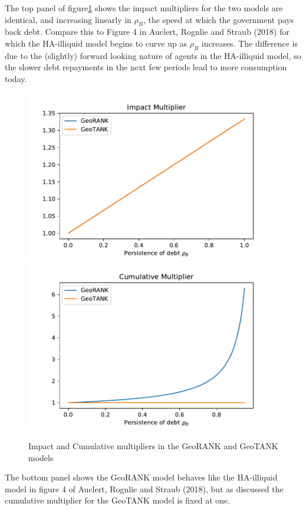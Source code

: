 \documentclass{article}
\begin{document}
The top panel of figure\ref{fig:multipliers} shows the impact multipliers for the two models are identical, and increasing linearly in $\rho_B$, the speed at which the government pays back debt. Compare this to Figure 4 in Auclert, Rognlie and Straub (2018) for which the HA-illiquid model begins to curve up as $\rho_B$ increases. The difference is due to the (slightly) forward looking nature of agents in the HA-illiquid model, so the slower debt repayments in the next few periods lead to more consumption today.
\begin{figure} 
	\begin{centering}
		\includegraphics[scale=0.6]{../../Python/DoloCode/GeoTANK/Figures/impact_multiplier.pdf}		
		\includegraphics[scale=0.6]{../../Python/DoloCode/GeoTANK/Figures/cum_multiplier.pdf}
		\caption{Impact and Cumulative multipliers in the GeoRANK and GeoTANK models}
		\label{fig:multipliers}
	\end{centering}
\end{figure}
The bottom panel shows the GeoRANK model behaves like the HA-illiquid model in figure 4 of  Auclert, Rognlie and Straub (2018), but as discussed the cumulative multiplier for the GeoTANK model is fixed at one.
\end{document}
